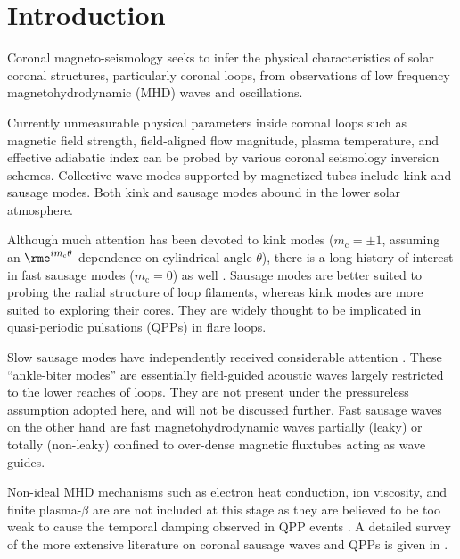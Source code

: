 \documentclass[12pt]{iopart}
\newcommand{\jpa}{{\it J. Phys. A: Math. Theor.} }
\newcommand{\ri}{{i}}
\begin{document}

\submitto{\jpa}

\maketitle



\section{Introduction}
Coronal magneto-seismology seeks to infer the physical characteristics of solar coronal structures, particularly coronal loops, from observations of low frequency magneto\-hydro\-dynamic (MHD) waves and oscillations. 

Currently unmeasurable physical parameters inside coronal loops such as magnetic field strength, field-aligned flow magnitude, plasma temperature, and effective adiabatic index can be probed by various coronal seismology inversion schemes.  Collective wave modes supported by magnetized tubes include kink and sausage modes. Both kink and sausage modes abound in the lower solar atmosphere.

Although much attention has been devoted to kink modes ($m_\text{c}=\pm1$, assuming an $\rme^{\ri m_\text{c}\theta}$ dependence on cylindrical angle $\theta$), there is a long history of interest in fast sausage modes ($m_\text{c}=0$) as well \cite{AscNakMel04aa,KopMelSte07aa,IngvanBra09aa,PasNakArb09aa,CheLiXio15aa,GuoCheLi16aa}. Sausage modes are better suited to probing the radial structure of loop filaments, whereas kink modes are more suited to exploring their cores. They are widely thought to be implicated in quasi-periodic pulsations (QPPs) \cite{NakMel09aa} in flare loops.

Slow sausage modes have independently received considerable attention \cite{De-IreWal02aa,NakVer05aa,De-09aa}. These  ``ankle-biter modes'' are essentially field-guided acoustic waves largely restricted to the lower reaches of loops. They are not present under the pressureless assumption adopted here, and will not be discussed further. Fast sausage waves on the other hand are fast magneto\-hydro\-dynamic waves partially (leaky) or totally (non-leaky) confined to over-dense magnetic fluxtubes acting as wave guides. 

Non-ideal MHD mechanisms such as electron heat conduction, ion viscosity, and finite plasma-$\beta$ are are not included at this stage as they are believed to be too weak to cause the temporal damping observed in QPP events \cite{KopMelSte07aa,IngvanBra09aa}. A detailed survey of the more extensive literature on coronal sausage waves and QPPs is given in \cite{CheLiXio15aa}.
\end{document}
